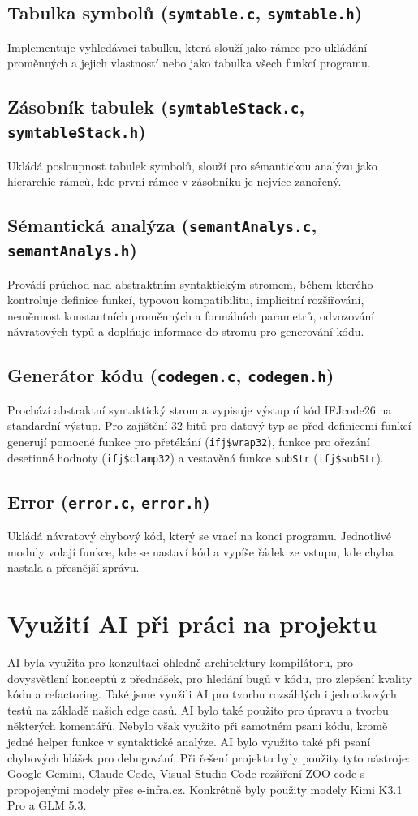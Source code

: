 \documentclass[12pt, a4paper]{article}
\begin{document}
\subsection{Tabulka symbolů (\texttt{symtable.c}, \texttt{symtable.h})}
Implementuje vyhledávací tabulku, která slouží jako rámec pro ukládání proměnných a jejich vlastností nebo jako tabulka všech funkcí programu.

\subsection{Zásobník tabulek (\texttt{symtableStack.c}, \texttt{symtableStack.h})}
Ukládá posloupnost tabulek symbolů, slouží pro sémantickou analýzu jako hierarchie rámců, kde první rámec v zásobníku je nejvíce zanořený.

\subsection{Sémantická analýza (\texttt{semantAnalys.c}, \texttt{semantAnalys.h})}
Provádí průchod nad abstraktním syntaktickým stromem, během kterého kontroluje definice funkcí, typovou kompatibilitu, implicitní rozšiřování, neměnnost konstantních proměnných a formálních parametrů, odvozování návratových typů a doplňuje informace do stromu pro generování kódu.

\subsection{Generátor kódu (\texttt{codegen.c}, \texttt{codegen.h})}
Prochází abstraktní syntaktický strom a vypisuje výstupní kód IFJcode26 na standardní výstup. Pro zajištění 32 bitů pro datový typ se před definicemi funkcí generují pomocné funkce pro přetékání (\texttt{ifj\$wrap32}), funkce pro ořezání desetinné hodnoty (\texttt{ifj\$clamp32}) a vestavěná funkce \texttt{subStr} (\texttt{ifj\$subStr}).

\subsection{Error (\texttt{error.c}, \texttt{error.h})}
Ukládá návratový chybový kód, který se vrací na konci programu. Jednotlivé moduly volají funkce, kde se nastaví kód a vypíše řádek ze vstupu, kde chyba nastala a přesnější zprávu.


\section{Využití AI při práci na projektu}  
AI byla využita pro konzultaci ohledně architektury kompilátoru, pro dovysvětlení konceptů z přednášek, pro hledání bugů v kódu, pro zlepšení kvality kódu a refactoring. Také jsme využili AI pro tvorbu rozsáhlých i jednotkových testů na základě našich edge casů. AI bylo také použito pro úpravu a tvorbu některých komentářů. Nebylo však využito při samotném psaní kódu, kromě jedné helper funkce v syntaktické analýze. AI bylo využito také při psaní chybových hlášek pro debugování.
Při řešení projektu byly použity tyto nástroje: Google Gemini, Claude Code, Visual Studio Code rozšíření ZOO code s propojenými modely přes e-infra.cz. Konkrétně byly použity modely Kimi K3.1 Pro a GLM 5.3.
\end{document}
